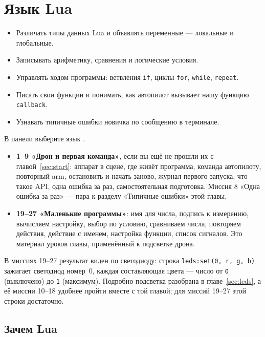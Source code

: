 \section{Язык Lua}
\label{sec:lua}

\begin{infobox}
\begin{itemize}
    \item Различать типы данных Lua и объявлять переменные --- локальные и глобальные.
    \item Записывать арифметику, сравнения и логические условия.
    \item Управлять ходом программы: ветвления \texttt{if}, циклы \texttt{for}, \texttt{while}, \texttt{repeat}.
    \item Писать свои функции и понимать, как автопилот вызывает нашу функцию \texttt{callback}.
    \item Узнавать типичные ошибки новичка по сообщению в терминале.
\end{itemize}
\end{infobox}

\begin{missionbox}
В панели  выберите язык .
\begin{itemize}
    \item \textbf{1--9 «Дрон и первая команда»}, если вы ещё не прошли их с главой~\ref{sec:start}: аппарат в сцене, где живёт программа, команда автопилоту, повторный arm, остановить и начать заново, журнал первого запуска, что такое API, одна ошибка за раз, самостоятельная подготовка. Миссия 8 «Одна ошибка за раз» --- пара к разделу «Типичные ошибки» этой главы.
    \item \textbf{19--27 «Маленькие программы»}: имя для числа, подпись к измерению, вычисляем настройку, выбор по условию, сравниваем числа, повторяем действия, действие с именем, настройка функции, список сигналов. Это материал уроков главы, применённый к подсветке дрона.
\end{itemize}
В миссиях 19--27 результат виден по светодиоду: строка \verb|leds:set(0, r, g, b)| зажигает светодиод номер~0, каждая составляющая цвета --- число от \verb|0| (выключено) до \verb|1| (максимум). Подробно подсветка разобрана в главе~\ref{sec:leds}, а её миссии 10--18 удобнее пройти вместе с той главой; для миссий 19--27 этой строки достаточно.
\end{missionbox}

\subsection{Зачем Lua}

